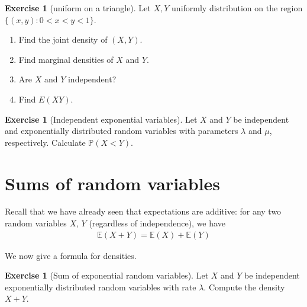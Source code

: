 \documentclass[11pt]{article}
\theoremstyle{definition}
\newtheorem{exercise}[]{Exercise}
\renewcommand{\P}{\mathbb{P}}
\newcommand{\E}{\mathbb{E}}
\begin{document}
\begin{exercise}[uniform on a triangle]
Let $X, Y$ uniformly distribution on the region
$\{(x, y) : 0 < x < y < 1\}$.
\begin{enumerate}[label = (\alph*)]
  \item Find the joint density of $(X, Y)$.
  \item Find marginal densities of $X$ and $Y$.
  \item Are $X$ and $Y$ independent?
  \item Find $E(XY)$.
\end{enumerate}
\end{exercise}


\begin{exercise}[Independent exponential variables]
Let $X$ and $Y$ be independent and exponentially
distributed random variables with parameters $\lambda$ and $\mu$, respectively. Calculate $\P(X<Y)$.
\end{exercise}

\section{Sums of random variables}

Recall that we have already seen that expectations are additive: for any two random variables $X$, $Y$
(regardless of independence), we have
\begin{align*}
  \E(X + Y) = \E(X) + \E(Y)
\end{align*}

We now give a formula for densities.


\begin{exercise}[Sum of exponential random variables]
Let $X$ and $Y$ be independent exponentially distributed
random variables with rate $\lambda$. Compute
the density $X + Y$.
\end{exercise}
\end{document}
